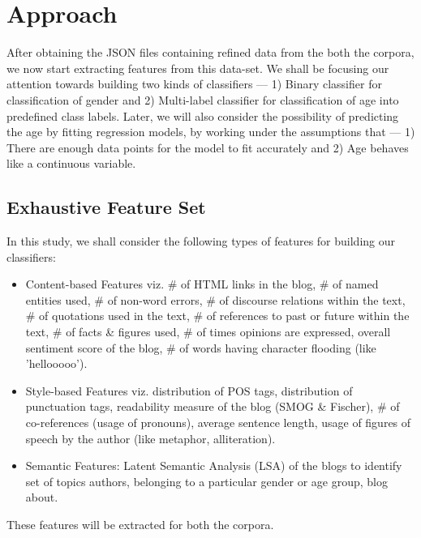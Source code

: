 \documentclass{sig-alternate}
\begin{document}
\section{Approach}
After obtaining the JSON files containing refined data from the both the corpora, we now start extracting features from this data-set. We shall be focusing our attention towards building two kinds of classifiers --- 1) Binary classifier for classification of gender and 2) Multi-label classifier for classification of age into predefined class labels. Later, we will also consider the possibility of predicting the age by fitting regression models, by working under the assumptions that --- 1) There are enough data points for the model to fit accurately and 2) Age behaves like a continuous variable. 
\subsection{Exhaustive Feature Set} In this study, we shall consider the following types of features for building our classifiers:
\begin{itemize}
\item Content-based Features viz. \# of HTML links in the blog, \# of named entities used, \# of non-word errors, \# of discourse relations within the text, \# of quotations used in the text, \# of references to past or future within the text, \# of facts \& figures used, \# of times opinions are expressed, overall sentiment score of the blog, \# of words having character flooding (like 'hellooooo').
\item Style-based Features viz. distribution of POS tags, distribution of punctuation tags, readability measure of the blog (SMOG \& Fischer), \# of co-references (usage of pronouns), average sentence length, usage of figures of speech by the author (like metaphor, alliteration). 
\item Semantic Features: Latent Semantic Analysis (LSA) of the blogs to identify set of topics authors, belonging to a particular gender or age group, blog about.
\end{itemize}
These features will be extracted for both the corpora.
\end{document}
